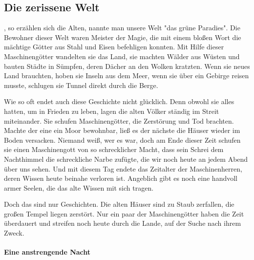 \subsection{Die zerissene Welt}

, so erzählen sich die Alten, nannte man unsere Welt "das grüne Paradies". Die Bewohner dieser Welt waren Meister der Magie, die mit einem bloßen Wort die mächtige Götter aus Stahl und Eisen befehligen konnten. Mit Hilfe dieser Maschinengötter wandelten sie das Land, sie machten Wälder aus Wüsten und bauten Städte in Sümpfen, deren Dächer an den Wolken kratzten. Wenn sie neues Land brauchten, hoben sie Inseln aus dem Meer, wenn sie über ein Gebirge reisen musste, schlugen sie Tunnel direkt durch die Berge.

Wie so oft endet auch diese Geschichte nicht glücklich. Denn obwohl sie alles hatten, um in Frieden zu leben, lagen die alten Völker ständig im Streit miteinander. Sie schufen Maschinengötter, die Zerstörung und Tod brachten. Machte der eine ein Moor bewohnbar, ließ es der nächste die Häuser wieder im Boden versacken. Niemand weiß, wer es war, doch am Ende dieser Zeit schufen sie einen Maschinengott von so schrecklicher Macht, dass sein Schrei dem Nachthimmel die schreckliche Narbe zufügte, die wir noch heute an jedem Abend über uns sehen. Und mit diesem Tag endete das Zeitalter der Maschinenherren, deren Wissen heute beinahe verloren ist. Angeblich gibt es noch eine handvoll armer Seelen, die das alte Wissen mit sich tragen.

Doch das sind nur Geschichten. Die alten Häuser sind zu Staub zerfallen, die großen Tempel liegen zerstört. Nur ein paar der Maschinengötter haben die Zeit überdauert und streifen noch heute durch die Lande, auf der Suche nach ihrem Zweck.

\paragraph{Eine anstrengende Nacht}

